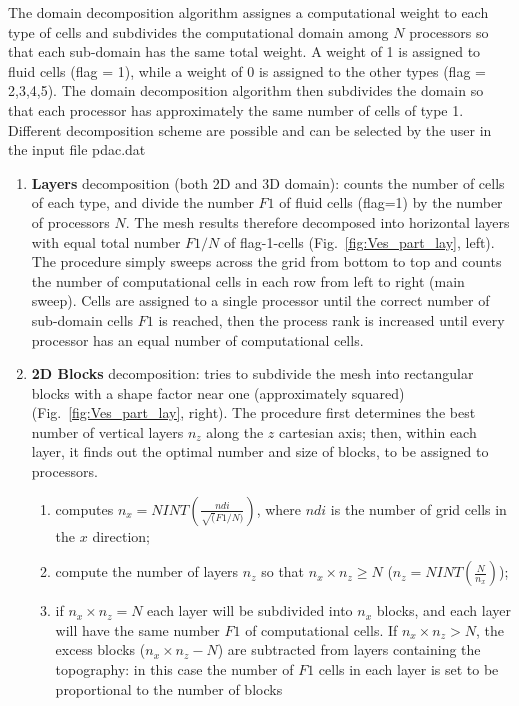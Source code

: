 The domain decomposition algorithm assignes a computational weight to each type 
of cells and subdivides the computational domain
among $N$ processors so that each sub-domain has the same total weight.
A weight of 1 is assigned to fluid cells (flag = 1),
while a weight of 0 is assigned to the other types (flag = 2,3,4,5). 
The domain decomposition algorithm then subdivides the domain so that each processor
has approximately the same number of cells of type 1. Different decomposition scheme are possible
and can be selected by the user in the input file pdac.dat \\
\begin{enumerate}
\item {\bf Layers} decomposition (both 2D and 3D domain): 
counts the number of cells of each type, and divide the number $F1$ of fluid cells (flag=1)
by the number of processors $N$. The mesh results therefore decomposed into horizontal layers with equal total number
$F1/N$ of flag-1-cells (Fig.~\ref{fig:Ves_part_lay}, left). The procedure simply sweeps across
the grid from bottom to top and counts the number of computational cells in each row from
left to right (main sweep). Cells are assigned to a single processor until the correct number 
of sub-domain cells $F1$ is reached, then the process rank is increased until every 
processor has an equal number of computational cells.
\item {\bf  2D Blocks } decomposition: tries to subdivide the mesh
into rectangular blocks with a shape factor near one (approximately squared) 
(Fig.~\ref{fig:Ves_part_lay}, right). The procedure first determines the best number
of vertical layers $n_z$ along the $z$ cartesian axis; then, within each 
layer, it finds out the optimal number and size of blocks, to be assigned to processors.
\begin{enumerate}
\item computes $\displaystyle n_x = NINT\left(\frac{ndi}{\sqrt(F1/N)}\right)$, where $ndi$ is the
number of grid cells in the $x$ direction;
\item compute the number of layers $n_z$ so that $n_x \times n_z \ge N$ 
($\displaystyle n_z = NINT\left(\frac{N}{n_x}\right)$);
\item if $n_x \times n_z = N$ each layer will be subdivided into $n_x$ blocks, and each layer
will have the same number $F1$ of computational cells. If $n_x \times n_z > N$, the excess blocks
($n_x \times n_z - N$) are subtracted from layers containing the topography: in this case
the number of $F1$ cells in each layer is set to be proportional to the number of blocks

\end{enumerate}
\end{enumerate}
